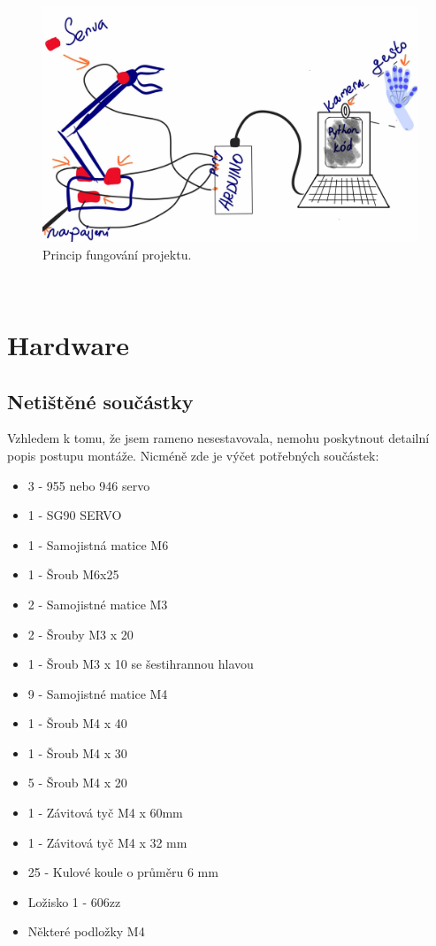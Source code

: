 \documentclass[12pt, a4paper,
twoside,        %
openright
]{report}
\let\oldchapter\chapter
\renewcommand{\chapter}{
	\clearpage
	\pagestyle{fancy}
	\fancyhf{}
	\renewcommand{\headrulewidth}{0pt}
	\fancyfoot[c]{\thepage}
	\
	\oldchapter
}
\renewcommand{\headrulewidth}{0.025pt}
\begin{document}
{\begin{figure}[h]
	\centering
	\includegraphics[width=0.9\linewidth]{image/princip.jpg} 
	
	
	\caption{Princip fungování projektu.} %
	\label{fig:princip} %
\end{figure}


\chapter{Hardware}
	\section{Netištěné součástky}
Vzhledem k tomu, že jsem rameno nesestavovala, nemohu poskytnout detailní popis postupu montáže. Nicméně zde je výčet potřebných součástek:

\begin{itemize}
	\item	 3 - 955 nebo 946 servo
	\item 	1 - SG90 SERVO
	\item 	1 - Samojistná matice M6
	\item 	1 - Šroub M6x25
	\item 	2 - Samojistné matice M3
	\item 	2 - Šrouby M3 x 20
	\item 	1 - Šroub M3 x 10 se šestihrannou hlavou
	\item 	9 - Samojistné matice M4
	\item 	1 - Šroub M4 x 40
	\item 	1 - Šroub M4 x 30
	\item 	5 - Šroub M4 x 20
	\item 	1 - Závitová tyč M4 x 60mm
	\item 	1 - Závitová tyč M4 x 32 mm
	\item 	25 - Kulové koule o průměru 6 mm
	\item 	Ložisko 1 - 606zz
	\item 	Některé podložky M4
\end{itemize}


}
\end{document}
